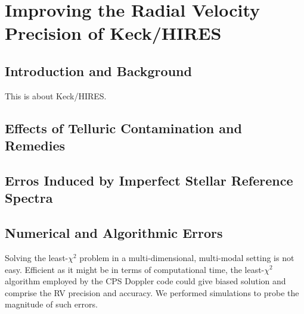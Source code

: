 \chapter{Improving the Radial Velocity Precision of Keck/HIRES}\label{chap:keck}


\section{Introduction and Background}

This is about Keck/HIRES.


\section{Effects of Telluric Contamination and Remedies}\label{keck:sec:telluric}






\section{Erros Induced by Imperfect Stellar Reference Spectra}\label{keck:sec:dsst}




\section{Numerical and Algorithmic Errors}\label{keck:sec:algorithm}

Solving the least-$\chi^2$ problem in a multi-dimensional, multi-modal
setting is not easy. Efficient as it might be in terms of
computational time, the least-$\chi^2$ algorithm employed by the CPS
Doppler code could give biased solution and comprise the RV precision
and accuracy. We performed simulations to probe the magnitude of such
errors.

